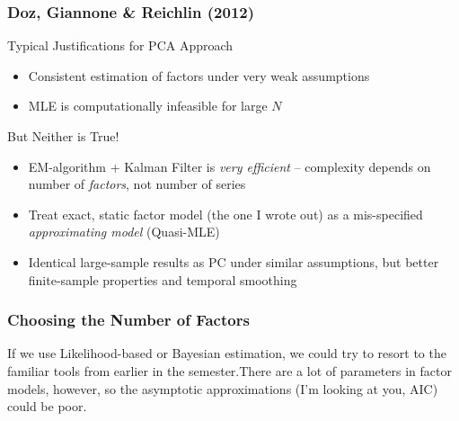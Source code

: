 \documentclass[handout]{beamer}
\begin{document}
\begin{frame}
	\frametitle{Doz, Giannone \& Reichlin (2012)}
\begin{block}
	{Typical Justifications for PCA Approach}
	\begin{itemize}
		\item Consistent estimation of factors under very weak assumptions 
		\item MLE is computationally infeasible for large $N$
	\end{itemize}
\end{block}

\begin{block}
	{But Neither is True!}
	\begin{itemize}
		\item EM-algorithm + Kalman Filter is \emph{very efficient} -- complexity depends on number of \emph{factors}, not number of series
		\item Treat exact, static factor model (the one I wrote out) as a mis-specified \emph{approximating model} (Quasi-MLE)
		\item Identical large-sample results as PC under similar assumptions, but better finite-sample properties and temporal smoothing
	\end{itemize}
\end{block}
\end{frame}
\begin{frame}
	\frametitle{Choosing the Number of Factors}
If we use Likelihood-based or Bayesian estimation, we could try to resort to the familiar tools from earlier in the semester.There are a lot of parameters in factor models, however, so the asymptotic approximations (I'm looking at you, AIC) could be poor. 
\end{frame}
\end{document}
